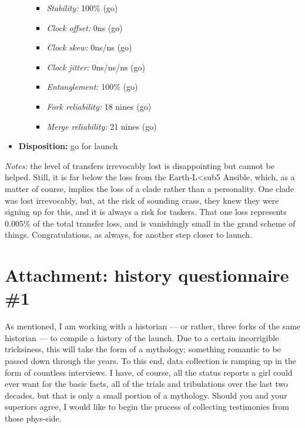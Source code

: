 \begin{itemize}
\begin{itemize}
    \begin{itemize}
    \tightlist
    \item
      \emph{Stability:} 100\% (go)
    \item
      \emph{Clock offset:} 0ns (go)
    \item
      \emph{Clock skew:} 0ns/ns (go)
    \item
      \emph{Clock jitter:} 0ns/ns/ns (go)
    \item
      \emph{Entanglement:} 100\% (go)
    \item
      \emph{Fork reliability:} 18 nines (go)
    \item
      \emph{Merge reliability:} 21 nines (go)
    \end{itemize}
  \end{itemize}
\item
  \textbf{Disposition:} go for launch
\end{itemize}

\emph{Notes:} the level of transfers irrevocably lost is disappointing but cannot be helped. Still, it is far below the loss from the Earth-L\textless sub5 Ansible, which, as a matter of course, implies the loss of a clade rather than a personality. One clade was lost irrevocably, but, at the risk of sounding crass, they knew they were signing up for this, and it is always a risk for taskers. That one loss represents 0.005\% of the total transfer loss, and is vanishingly small in the grand scheme of things. Congratulations, as always, for another step closer to launch.

\hypertarget{attachment-history-questionnaire-1}{%
\section{Attachment: history questionnaire \#1}\label{attachment-history-questionnaire-1}}

As mentioned, I am working with a historian — or rather, three forks of the same historian — to compile a history of the launch. Due to a certain incorrigible tricksiness, this will take the form of a mythology; something romantic to be passed down through the years. To this end, data collection is ramping up in the form of countless interviews. I have, of course, all the status reports a girl could ever want for the basic facts, all of the trials and tribulations over the last two decades, but that is only a small portion of a mythology. Should you and your superiors agree, I would like to begin the process of collecting testimonies from those phys-side.

